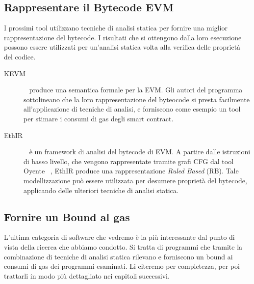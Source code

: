 \subsection{Rappresentare il Bytecode EVM}

I prossimi tool utilizzano tecniche di analisi statica per fornire una miglior rappresentazione del bytecode. I risultati che si ottengono dalla loro esecuzione possono essere utilizzati per un'analisi statica volta alla verifica delle proprietà del codice.\newline

\begin{description}

    \item[KEVM] ~\cite{hildenbrandt2017kevm} produce una semantica formale per la EVM. Gli autori del programma sottolineano che la loro rappresentazione del byteocode si presta facilmente all'applicazione di tecniche di analisi, e forniscono come esempio un tool per stimare i consumi di gas degli smart contract.\newline

    \item[EthIR] ~\cite{albert2018ethir} è un framework di analisi del bytecode di EVM. A partire dalle istruzioni di basso livello, che vengono rappresentate tramite grafi CFG dal tool Oyente ~\cite{melonproject/oyente}, EthIR produce una rappresentazione \textit{Ruled Based} (RB). Tale modellizzazione può essere utilizzata per desumere proprietà del bytecode, applicando delle ulteriori tecniche di analisi statica.\newline
    
\end{description}

\subsection{Fornire un Bound al gas}

L'ultima categoria di software che vedremo è la più interessante dal punto di vista della ricerca che abbiamo condotto. Si tratta di programmi che tramite la combinazione di tecniche di analisi statica rilevano e forniscono un bound ai consumi di gas dei programmi esaminati.\newline
\indent Li citeremo per completezza, per poi trattarli in modo più dettagliato nei capitoli successivi.\newline

